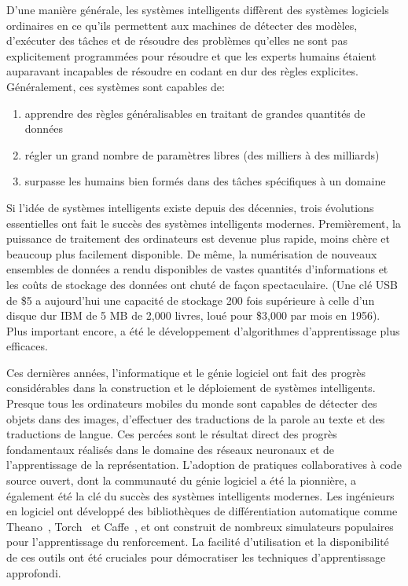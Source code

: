 D'une manière générale, les systèmes intelligents diffèrent des systèmes logiciels ordinaires en ce qu'ils permettent aux machines de détecter des modèles, d'exécuter des tâches et de résoudre des problèmes qu'elles ne sont pas explicitement programmées pour résoudre et que les experts humains étaient auparavant incapables de résoudre en codant en dur des règles explicites. Généralement, ces systèmes sont capables de:\\
%
\begin{enumerate}
\item apprendre des règles généralisables en traitant de grandes quantités de données
\item régler un grand nombre de paramètres libres (des milliers à des milliards)
\item surpasse les humains bien formés dans des tâches spécifiques à un domaine
\end{enumerate}
%
Si l'idée de systèmes intelligents existe depuis des décennies, trois évolutions essentielles ont fait le succès des systèmes intelligents modernes. Premièrement, la puissance de traitement des ordinateurs est devenue plus rapide, moins chère et beaucoup plus facilement disponible. De même, la numérisation de nouveaux ensembles de données a rendu disponibles de vastes quantités d'informations et les coûts de stockage des données ont chuté de façon spectaculaire. (Une clé USB de \$5 a aujourd'hui une capacité de stockage 200 fois supérieure à celle d'un disque dur IBM de 5 MB de 2,000 livres, loué pour \$3,000 par mois en 1956). Plus important encore, a été le développement d'algorithmes d'apprentissage plus efficaces.

Ces dernières années, l'informatique et le génie logiciel ont fait des progrès considérables dans la construction et le déploiement de systèmes intelligents. Presque tous les ordinateurs mobiles du monde sont capables de détecter des objets dans des images, d'effectuer des traductions de la parole au texte et des traductions de langue. Ces percées sont le résultat direct des progrès fondamentaux réalisés dans le domaine des réseaux neuronaux et de l'apprentissage de la représentation. L'adoption de pratiques collaboratives à code source ouvert, dont la communauté du génie logiciel a été la pionnière, a également été la clé du succès des systèmes intelligents modernes. Les ingénieurs en logiciel ont développé des bibliothèques de différentiation automatique comme Theano~\citep{bergstra2010theano}, Torch~\citep{collobert2002torch} et Caffe~\citep{jia2014caffe}, et ont construit de nombreux simulateurs populaires pour l'apprentissage du renforcement. La facilité d'utilisation et la disponibilité de ces outils ont été cruciales pour démocratiser les techniques d'apprentissage approfondi.

